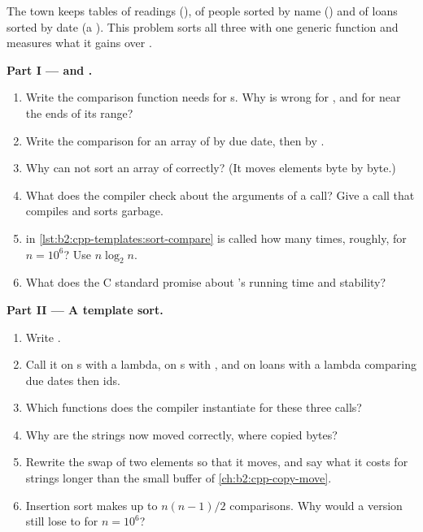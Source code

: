 \begin{problem}\label{pb:b2:cpp-templates:1}
The town keeps tables of readings (), of people sorted by name () and of loans sorted
by date (a ). This problem sorts all three with one generic function and measures what it gains over
.

\medskip\noindent\textbf{Part I ---  and .}\par\nopagebreak
\begin{enumerate}[beginpenalty=10000]
\item Write the comparison function  needs for s. Why is  wrong for
, and for  near the ends of its range?
\item Write the comparison for an array of  by due date, then by
.
\item Why can  not sort an array of  correctly? (It moves elements byte by byte.)
\item What does the compiler check about the arguments of a  call? Give a call that compiles and sorts
garbage.
\item {} in \cref{lst:b2:cpp-templates:sort-compare} is called how many times, roughly, for
$n = 10^6$? Use $n \log_2 n$.
\item What does the C standard promise about 's running time and stability?
\end{enumerate}

\medskip\noindent\textbf{Part II --- A template sort.}\par\nopagebreak
\begin{enumerate}[resume, beginpenalty=10000]
\item Write .
\item Call it on s with a lambda, on s with , and on loans with a
lambda comparing due dates then ids.
\item Which functions does the compiler instantiate for these three calls?
\item Why are the strings now moved correctly, where  copied bytes?
\item Rewrite the swap of two elements so that it moves, and say what it costs for strings longer than the small
buffer of \cref{ch:b2:cpp-copy-move}.
\item Insertion sort makes up to $n(n-1)/2$ comparisons. Why would a  version still lose to  for
$n = 10^6$?
\end{enumerate}


\end{problem}
